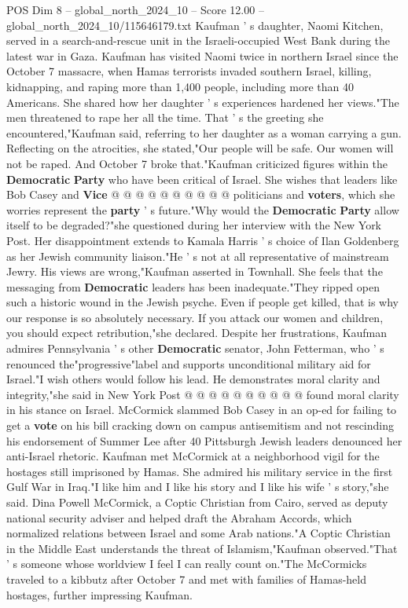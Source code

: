 \begin{textsample}{POS Dim 8 – global\_north\_2024\_10 – Score 12.00 – global\_north\_2024\_10/115646179.txt}
Kaufman ' s daughter, Naomi Kitchen, served in a search-and-rescue unit in the Israeli-occupied West Bank during the latest war in Gaza.
Kaufman has visited Naomi twice in northern Israel since the October 7 massacre, when Hamas terrorists invaded southern Israel, killing, kidnapping, and raping more than 1,400 people, including more than 40 Americans.
She shared how her daughter ' s experiences hardened her views."The men threatened to rape her all the time.
That ' s the greeting she encountered,"Kaufman said, referring to her daughter as a woman carrying a gun.
Reflecting on the atrocities, she stated,"Our people will be safe.
Our women will not be raped.
And October 7 broke that."Kaufman criticized figures within the \textbf{Democratic} \textbf{Party} who have been critical of Israel.
She wishes that leaders like Bob Casey and \textbf{Vice} @ @ @ @ @ @ @ @ @ @ politicians and \textbf{voters}, which she worries represent the \textbf{party} ' s future."Why would the \textbf{Democratic} \textbf{Party} allow itself to be degraded?"she questioned during her interview with the New York Post.
Her disappointment extends to Kamala Harris ' s choice of Ilan Goldenberg as her Jewish community liaison."He ' s not at all representative of mainstream Jewry.
His views are wrong,"Kaufman asserted in Townhall.
She feels that the messaging from \textbf{Democratic} leaders has been inadequate."They ripped open such a historic wound in the Jewish psyche.
Even if people get killed, that is why our response is so absolutely necessary.
If you attack our women and children, you should expect retribution,"she declared.
Despite her frustrations, Kaufman admires Pennsylvania ' s other \textbf{Democratic} senator, John Fetterman, who ' s renounced the"progressive"label and supports unconditional military aid for Israel."I wish others would follow his lead.
He demonstrates moral clarity and integrity,"she said in New York Post @ @ @ @ @ @ @ @ @ @ found moral clarity in his stance on Israel.
McCormick slammed Bob Casey in an op-ed for failing to get a \textbf{vote} on his bill cracking down on campus antisemitism and not rescinding his endorsement of Summer Lee after 40 Pittsburgh Jewish leaders denounced her anti-Israel rhetoric.
Kaufman met McCormick at a neighborhood vigil for the hostages still imprisoned by Hamas.
She admired his military service in the first Gulf War in Iraq."I like him and I like his story and I like his wife ' s story,"she said.
Dina Powell McCormick, a Coptic Christian from Cairo, served as deputy national security adviser and helped draft the Abraham Accords, which normalized relations between Israel and some Arab nations."A Coptic Christian in the Middle East understands the threat of Islamism,"Kaufman observed."That ' s someone whose worldview I feel I can really count on."The McCormicks traveled to a kibbutz after October 7 and met with families of Hamas-held hostages, further impressing Kaufman.

\end{textsample}

